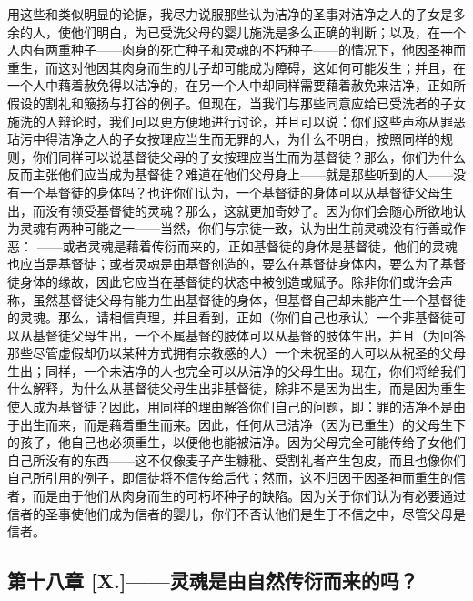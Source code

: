 用这些和类似明显的论据，我尽力说服那些认为洁净的圣事对洁净之人的子女是多余的人，使他们明白，为已受洗父母的婴儿施洗是多么正确的判断；以及，在一个人内有两重种子——肉身的死亡种子和灵魂的不朽种子——的情况下，他因圣神而重生，而这对他因其肉身而生的儿子却可能成为障碍，这如何可能发生；并且，在一个人中藉着赦免得以洁净的，在另一个人中却同样需要藉着赦免来洁净，正如所假设的割礼和簸扬与打谷的例子。但现在，当我们与那些同意应给已受洗者的子女施洗的人辩论时，我们可以更方便地进行讨论，并且可以说：你们这些声称从罪恶玷污中得洁净之人的子女按理应当生而无罪的人，为什么不明白，按照同样的规则，你们同样可以说基督徒父母的子女按理应当生而为基督徒？那么，你们为什么反而主张他们应当成为基督徒？难道在他们父母身上——就是那些听到的人——没有一个基督徒的身体吗？也许你们认为，一个基督徒的身体可以从基督徒父母生出，而没有领受基督徒的灵魂？那么，这就更加奇妙了。因为你们会随心所欲地认为灵魂有两种可能之一——当然，你们与宗徒一致，认为出生前灵魂没有行善或作恶： ——或者灵魂是藉着传衍而来的，正如基督徒的身体是基督徒，他们的灵魂也应当是基督徒；或者灵魂是由基督创造的，要么在基督徒身体内，要么为了基督徒身体的缘故，因此它应当在基督徒的状态中被创造或赋予。除非你们或许会声称，虽然基督徒父母有能力生出基督徒的身体，但基督自己却未能产生一个基督徒的灵魂。那么，请相信真理，并且看到，正如（你们自己也承认）一个非基督徒可以从基督徒父母生出，一个不属基督的肢体可以从基督的肢体生出，并且（为回答那些尽管虚假却仍以某种方式拥有宗教感的人）一个未祝圣的人可以从祝圣的父母生出；同样，一个未洁净的人也完全可以从洁净的父母生出。现在，你们将给我们什么解释，为什么从基督徒父母生出非基督徒，除非不是因为出生，而是因为重生使人成为基督徒？因此，用同样的理由解答你们自己的问题，即：罪的洁净不是由于出生而来，而是藉着重生而来。因此，任何从已洁净（因为已重生）的父母生下的孩子，他自己也必须重生，以便他也能被洁净。因为父母完全可能传给子女他们自己所没有的东西——这不仅像麦子产生糠秕、受割礼者产生包皮，而且也像你们自己所引用的例子，即信徒将不信传给后代；然而，这不归因于因圣神而重生的信者，而是由于他们从肉身而生的可朽坏种子的缺陷。因为关于你们认为有必要通过信者的圣事使他们成为信者的婴儿，你们不否认他们是生于不信之中，尽管父母是信者。\par


\subsection{第十八章 [X.]——灵魂是由自然传衍而来的吗？}

